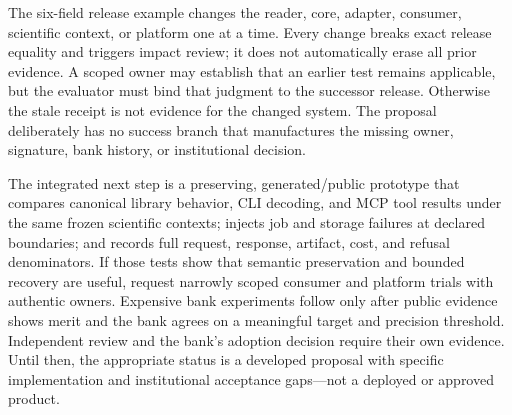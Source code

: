 The six-field release example changes the reader, core, adapter, consumer,
scientific context, or platform one at a time. Every change breaks exact
release equality and triggers impact review; it does not automatically erase
all prior evidence. A scoped owner may establish that an earlier test remains
applicable, but the evaluator must bind that judgment to the successor
release. Otherwise the stale receipt is not evidence for the changed system.
The proposal deliberately has no success branch that manufactures the missing
owner, signature, bank history, or institutional decision.
\citep{exec17_continuity_reference,exec17_continuity_contract}

The integrated next step is a preserving, generated/public prototype that
compares canonical library behavior, CLI decoding, and MCP tool results under
the same frozen scientific contexts; injects job and storage failures at
declared boundaries; and records full request, response, artifact, cost, and
refusal denominators. If those tests show that semantic preservation and
bounded recovery are useful, request narrowly scoped consumer and platform
trials with authentic owners. Expensive bank experiments follow only after
public evidence shows merit and the bank agrees on a meaningful target and
precision threshold. Independent review and the bank's adoption decision require their own evidence. Until then, the appropriate status is a developed proposal
with specific implementation and institutional acceptance gaps—not a
deployed or approved product.
\label{exec17:integration-continuity-end}
